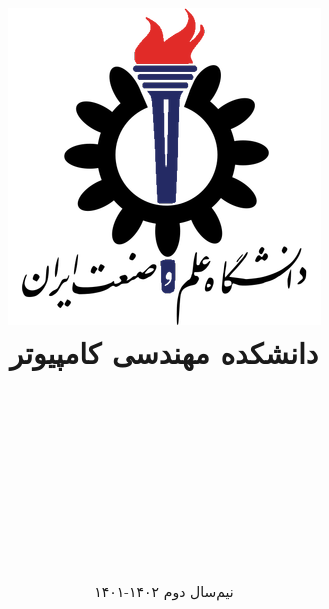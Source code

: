 \title{
    \includegraphics[width=0.35\linewidth]{images/IUST_logo_color.png} \\
    دانشکده مهندسی کامپیوتر \\[0.25in]
    \CourseName \\[0.25in]
    \ProjectName \\[0.25in]
  \\[0.25in]}
  
\date{نیم‌سال دوم ۱۴۰۲-۱۴۰۱}
\author{\TATwo \\ \TAOne \\ \\ \Instructor}

